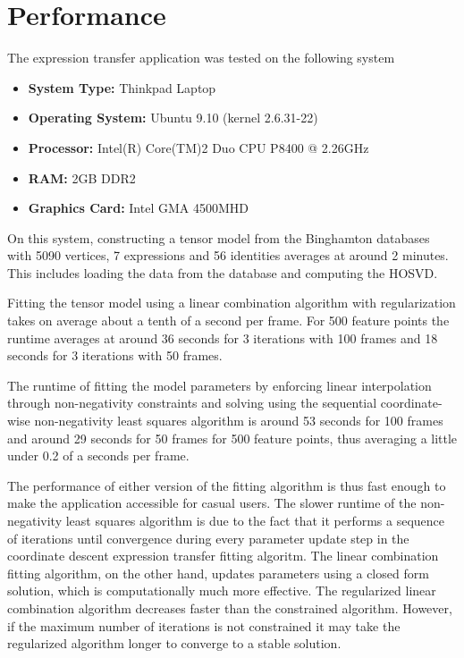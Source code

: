 \documentclass[11pt,a4paper,twoside]{report}
\begin{document}
\section{Performance}
The expression transfer application was tested on the following system
\begin{itemize}
\item \textbf{System Type:} Thinkpad Laptop
\item \textbf{Operating System:} Ubuntu 9.10 (kernel 2.6.31-22)
\item \textbf{Processor:} Intel(R) Core(TM)2 Duo CPU P8400 @ 2.26GHz
\item \textbf{RAM:} 2GB DDR2
\item \textbf{Graphics Card:} Intel GMA 4500MHD
\end{itemize}
On this system, constructing a tensor model from the Binghamton databases with
5090 vertices, 7 expressions and 56 identities averages at around 2 minutes. This
includes loading the data from the database and computing the HOSVD.

Fitting the tensor model using a linear combination algorithm with
regularization takes on average about a tenth of a second per frame. For 500
feature points the runtime averages at around 36 seconds for 3 iterations with 100 frames and 18
seconds for 3 iterations with 50 frames.

The runtime of fitting the model parameters by enforcing linear interpolation through
non-negativity constraints and solving using the sequential coordinate-wise
non-negativity least squares algorithm is around 53 seconds for 100
frames and around 29 seconds for 50 frames for 500 feature points, thus
averaging a little under 0.2 of a seconds per frame. 

The performance of either version of the fitting algorithm is thus fast enough
to make the application accessible for casual users. The slower runtime of the non-negativity least squares algorithm is due to the
fact that it performs a sequence of iterations until convergence during every parameter update step in the
coordinate descent expression transfer fitting algoritm. The linear
combination fitting algorithm, on the other hand, updates parameters using a
closed form solution, which is computationally much more effective. The regularized linear combination algorithm
decreases faster than the constrained algorithm. However, if the maximum number
of iterations is not constrained it may take the regularized algorithm longer to
converge to a stable solution.
\end{document}
